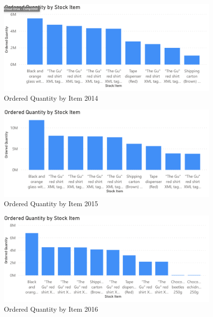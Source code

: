 \documentclass[12pt]{article}
\begin{document}
\begin{figure}[H]
    \centering
    \includegraphics [width=17.5cm]
    {images/Purchases/Ordered Quantity by Stock Item2014.png}
    \caption{Ordered Quantity by Item 2014}
    \label{Ordered Quantity by Item 2014}
\end{figure}

\begin{figure}[H]
    \centering
    \includegraphics [width=17.5cm]
    {images/Purchases/Ordered Quantity by Stock Item2015.png}
    \caption{Ordered Quantity by Item 2015}
    \label{Ordered Quantity by Item 2015}
\end{figure}

\begin{figure}[H]
    \centering
    \includegraphics [width=17.5cm]
    {images/Purchases/Ordered Quantity by Stock Item2016.png}
    \caption{Ordered Quantity by Item 2016}
    \label{Ordered Quantity by Item 2016}
\end{figure}
\end{document}
